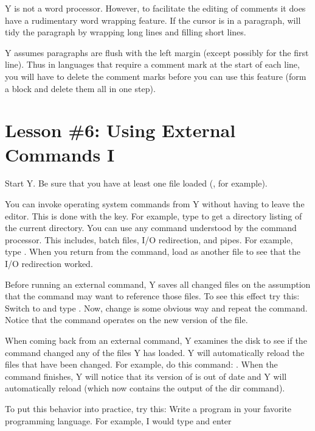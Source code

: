 Y is not a word processor. However, to facilitate the editing of comments it does have a
rudimentary word wrapping feature. If the cursor is in a paragraph,  will tidy the
paragraph by wrapping long lines and filling short lines.

Y assumes paragraphs are flush with the left margin (except possibly for the first line). Thus
in languages that require a comment mark at the start of each line, you will have to delete the
comment marks before you can use this feature (form a block and delete them all in one step).

\section{Lesson \#6: Using External Commands I}

Start Y. Be sure that you have at least one file loaded (, for example).

You can invoke operating system commands from Y without having to leave the editor. This is done
with the  key. For example, type  to get a directory listing of the
current directory. You can use any command understood by the command processor. This includes,
batch files, I/O redirection, and pipes. For example, type . When you
return from the command, load  as another file to see that the I/O redirection
worked.

Before running an external command, Y saves all changed files on the assumption that the command
may want to reference those files. To see this effect try this: Switch to 
and type . Now, change  is some obvious way and
repeat the command. Notice that the command operates on the new version of the file.

When coming back from an external command, Y examines the disk to see if the command changed any
of the files Y has loaded. Y will automatically reload the files that have been changed. For
example, do this command: . When the command finishes, Y will notice
that its version of  is out of date and Y will automatically reload
 (which now contains the output of the dir command).

To put this behavior into practice, try this: Write a program in your favorite programming
language. For example, I would type  and enter

